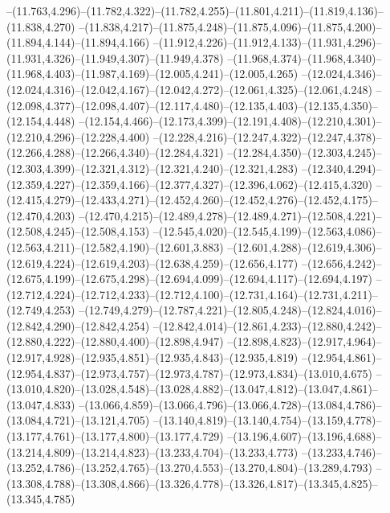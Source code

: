   --(11.763,4.296)--(11.782,4.322)--(11.782,4.255)--(11.801,4.211)--(11.819,4.136)--(11.838,4.270)%
  --(11.838,4.217)--(11.875,4.248)--(11.875,4.096)--(11.875,4.200)--(11.894,4.144)--(11.894,4.166)%
  --(11.912,4.226)--(11.912,4.133)--(11.931,4.296)--(11.931,4.326)--(11.949,4.307)--(11.949,4.378)%
  --(11.968,4.374)--(11.968,4.340)--(11.968,4.403)--(11.987,4.169)--(12.005,4.241)--(12.005,4.265)%
  --(12.024,4.346)--(12.024,4.316)--(12.042,4.167)--(12.042,4.272)--(12.061,4.325)--(12.061,4.248)%
  --(12.098,4.377)--(12.098,4.407)--(12.117,4.480)--(12.135,4.403)--(12.135,4.350)--(12.154,4.448)%
  --(12.154,4.466)--(12.173,4.399)--(12.191,4.408)--(12.210,4.301)--(12.210,4.296)--(12.228,4.400)%
  --(12.228,4.216)--(12.247,4.322)--(12.247,4.378)--(12.266,4.288)--(12.266,4.340)--(12.284,4.321)%
  --(12.284,4.350)--(12.303,4.245)--(12.303,4.399)--(12.321,4.312)--(12.321,4.240)--(12.321,4.283)%
  --(12.340,4.294)--(12.359,4.227)--(12.359,4.166)--(12.377,4.327)--(12.396,4.062)--(12.415,4.320)%
  --(12.415,4.279)--(12.433,4.271)--(12.452,4.260)--(12.452,4.276)--(12.452,4.175)--(12.470,4.203)%
  --(12.470,4.215)--(12.489,4.278)--(12.489,4.271)--(12.508,4.221)--(12.508,4.245)--(12.508,4.153)%
  --(12.545,4.020)--(12.545,4.199)--(12.563,4.086)--(12.563,4.211)--(12.582,4.190)--(12.601,3.883)%
  --(12.601,4.288)--(12.619,4.306)--(12.619,4.224)--(12.619,4.203)--(12.638,4.259)--(12.656,4.177)%
  --(12.656,4.242)--(12.675,4.199)--(12.675,4.298)--(12.694,4.099)--(12.694,4.117)--(12.694,4.197)%
  --(12.712,4.224)--(12.712,4.233)--(12.712,4.100)--(12.731,4.164)--(12.731,4.211)--(12.749,4.253)%
  --(12.749,4.279)--(12.787,4.221)--(12.805,4.248)--(12.824,4.016)--(12.842,4.290)--(12.842,4.254)%
  --(12.842,4.014)--(12.861,4.233)--(12.880,4.242)--(12.880,4.222)--(12.880,4.400)--(12.898,4.947)%
  --(12.898,4.823)--(12.917,4.964)--(12.917,4.928)--(12.935,4.851)--(12.935,4.843)--(12.935,4.819)%
  --(12.954,4.861)--(12.954,4.837)--(12.973,4.757)--(12.973,4.787)--(12.973,4.834)--(13.010,4.675)%
  --(13.010,4.820)--(13.028,4.548)--(13.028,4.882)--(13.047,4.812)--(13.047,4.861)--(13.047,4.833)%
  --(13.066,4.859)--(13.066,4.796)--(13.066,4.728)--(13.084,4.786)--(13.084,4.721)--(13.121,4.705)%
  --(13.140,4.819)--(13.140,4.754)--(13.159,4.778)--(13.177,4.761)--(13.177,4.800)--(13.177,4.729)%
  --(13.196,4.607)--(13.196,4.688)--(13.214,4.809)--(13.214,4.823)--(13.233,4.704)--(13.233,4.773)%
  --(13.233,4.746)--(13.252,4.786)--(13.252,4.765)--(13.270,4.553)--(13.270,4.804)--(13.289,4.793)%
  --(13.308,4.788)--(13.308,4.866)--(13.326,4.778)--(13.326,4.817)--(13.345,4.825)--(13.345,4.785)%
